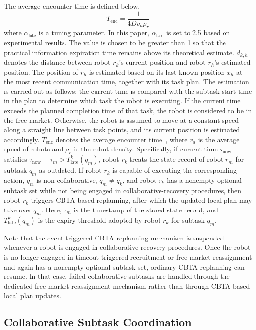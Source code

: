 \documentclass[lettersize,journal]{IEEEtran}
\begin{document}
The average encounter time is defined below.
\begin{equation} \label{enc}
	T_{\mathrm{enc}} = \frac{1}{4 D v_a \rho_r}
\end{equation}
where $\alpha_{\mathrm{late}}$ is a tuning parameter. In this paper, $\alpha_{\mathrm{late}}$ is set to 2.5 based on experimental results. The value is chosen to be greater than 1 so that the practical information expiration time remains above its theoretical estimate. $d_{k,h}$ denotes the distance between robot $r_k$'s current position and robot $r_h$'s estimated position. The position of $r_h$ is estimated based on its last known position $x_h$ at the most recent communication time, together with its task plan. The estimation is carried out as follows: the current time is compared with the subtask start time in the plan to determine which task the robot is executing. If the current time exceeds the planned completion time of that task, the robot is considered to be in the free market. Otherwise, the robot is assumed to move at a constant speed along a straight line between task points, and its current position is estimated accordingly. $T_{\mathrm{enc}}$ denotes the average encounter time~\cite{bettstetter2004stochastic}, where $v_a$ is the average speed of robots and $\rho_r$ is the robot density.
Specifically, if current time $\tau_{\mathrm{now}}$ satisfies
$\tau_{\mathrm{now}}-\tau_m > T_{\mathrm{late}}^k(q_m)$, 
robot $r_k$ treats the state record of robot $r_m$ for subtask $q_m$ as outdated. If robot $r_k$ is capable of executing the corresponding action, $q_m$ is non-collaborative, $q_m \neq q_k$, and robot $r_k$ has a nonempty optional-subtask set while not being engaged in collaborative-recovery procedures, then robot $r_k$ triggers CBTA-based replanning, after which the updated local plan may take over $q_m$. Here, $\tau_m$ is the timestamp of the stored state record, and $T_{\mathrm{late}}^k(q_m)$ is the expiry threshold adopted by robot $r_k$ for subtask $q_m$.

Note that the event-triggered CBTA replanning mechanism is suspended whenever a robot is engaged in collaborative-recovery procedures. Once the robot is no longer engaged in timeout-triggered recruitment or free-market reassignment and again has a nonempty optional-subtask set, ordinary CBTA replanning can resume. In that case, failed collaborative subtasks are handled through the dedicated free-market reassignment mechanism rather than through CBTA-based local plan updates.

\subsection{Collaborative Subtask Coordination}
\end{document}
